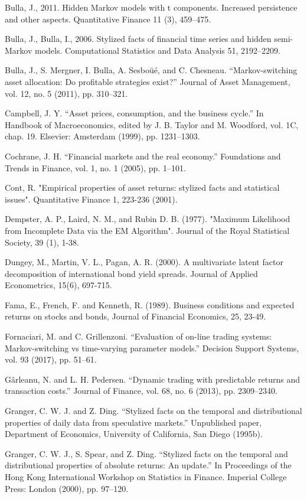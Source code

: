 Bulla, J., 2011. Hidden Markov models with t components. Increased persistence and other aspects. Quantitative Finance 11 (3), 459–475.

Bulla, J., Bulla, I., 2006. Stylized facts of financial time series and hidden semi- Markov models. Computational Statistics and Data Analysis 51, 2192–2209.

Bulla, J., S. Mergner, I. Bulla, A. Sesboüé, and C. Chesneau. “Markov-switching asset allocation: Do profitable strategies exist?” Journal of Asset Management, vol. 12, no. 5 (2011), pp. 310–321.

Campbell, J. Y. “Asset prices, consumption, and the business cycle.” In Handbook of Macroeconomics, edited by J. B. Taylor and M. Woodford, vol. 1C, chap. 19. Elsevier: Amsterdam (1999), pp. 1231–1303.

Cochrane, J. H. “Financial markets and the real economy.” Foundations and Trends in Finance, vol. 1, no. 1 (2005), pp. 1–101.

Cont, R. "Empirical properties of asset returns: stylized facts and statistical issues". Quantitative Finance 1, 223-236 (2001).

Dempster, A. P., Laird, N. M., and Rubin D. B. (1977). "Maximum Likelihood from Incomplete Data via the EM Algorithm". Journal of the Royal Statistical Society, 39 (1), 1-38.

Dungey, M., Martin, V. L., Pagan, A. R. (2000). A multivariate latent factor decomposition of international bond yield spreads. Journal of Applied Econometrics, 15(6), 697-715.

Fama, E., French, F. and Kenneth, R. (1989). Business conditions and expected returns on stocks and bonds, Journal of Financial Economics, 25, 23-49.

Fornaciari, M. and C. Grillenzoni. “Evaluation of on-line trading systems: Markov-switching vs time-varying parameter models.” Decision Support Systems, vol. 93 (2017), pp. 51–61.

Gârleanu, N. and L. H. Pedersen. “Dynamic trading with predictable returns and
transaction costs.” Journal of Finance, vol. 68, no. 6 (2013), pp. 2309–2340.

Granger, C. W. J. and Z. Ding. “Stylized facts on the temporal and distributional properties of daily data from speculative markets.” Unpublished paper, Department of Economics, University of California, San Diego (1995b).

Granger, C. W. J., S. Spear, and Z. Ding. “Stylized facts on the temporal and
distributional properties of absolute returns: An update.” In Proceedings of
the Hong Kong International Workshop on Statistics in Finance. Imperial
College Press: London (2000), pp. 97–120.

